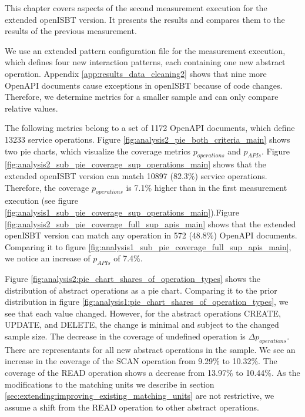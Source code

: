 This chapter covers aspects of the second measurement execution for the extended openISBT version. It presents the results and compares them to the results of the previous measurement. 



We use an extended pattern configuration file for the measurement execution, which defines four new interaction patterns, each containing one new abstract operation. 
Appendix \ref{app:results_data_cleaning2} shows that nine more OpenAPI documents cause exceptions in openISBT because of code changes.
Therefore, we determine metrics for a smaller sample and can only compare relative values. 



The following metrics belong to a set of 1172 OpenAPI documents, which define 13233 service operations. Figure \ref{fig:analysis2_pie_both_criteria_main} shows two pie charts, which visualize the coverage metrics $p_{operations}$ and $p_{APIs}$. Figure \ref{fig:analysis2_sub_pie_coverage_sup_operations_main} shows that the extended openISBT version can match 10897 (82.3\%) service operations. Therefore, the coverage $p_{operations}$ is 7.1\% higher than in the first measurement execution (see figure \ref{fig:analysis1_sub_pie_coverage_sup_operations_main}).Figure \ref{fig:analysis2_sub_pie_coverage_full_sup_apis_main} shows that the extended openISBT version can match any operation in 572 (48.8\%) OpenAPI documents. 
Comparing it to figure \ref{fig:analysis1_sub_pie_coverage_full_sup_apis_main}, we notice an increase of $p_{APIs}$ of 7.4\%.

Figure \ref{fig:analysis2:pie_chart_shares_of_operation_types} shows the distribution of abstract operations as a pie chart. 
Comparing it to the prior distribution in figure \ref{fig:analysis1:pie_chart_shares_of_operation_types}, we see that each value changed. However, for the abstract operations CREATE, UPDATE, and DELETE, the change is minimal and subject to the changed sample size.
The decrease in the coverage of undefined operation is $\Delta p_{operations}$.
There are representants for all new abstract operations in the sample.
We see an increase in the coverage of the SCAN operation from 9.29\% to 10.32\%. 
The coverage of the READ operation shows a decrease from 13.97\%  to 10.44\%. As the modifications to the matching units we describe in section \ref{sec:extending:improving_existing_matching_units} are not restrictive, we assume a shift from the READ operation to other abstract operations. 